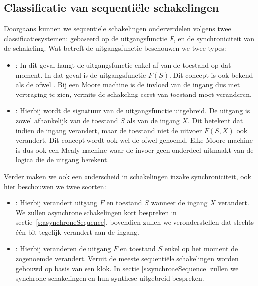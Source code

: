 \subsection{Classificatie van sequenti\"ele schakelingen}
\label{ss:classificationSequential}
Doorgaans kunnen we sequenti\"ele schakelingen onderverdelen volgens twee classificatiesystemen: gebaseerd op de uitgangsfunctie $F$, en de synchroniciteit van de schakeling. Wat betreft de uitgangsfunctie beschouwen we twee types:
\begin{itemize}
 \item {}: In dit geval hangt de uitgangsfunctie enkel af van de toestand op dat moment. In dat geval is de uitgangsfunctie $F\left(S\right)$. Dit concept is ook bekend als de  ofwel . Bij een Moore machine is de invloed van de ingang dus met vertraging te zien, vermits de schakeling eerst van toestand moet veranderen.
 \item {}: Hierbij wordt de signatuur van de uitgangsfunctie uitgebreid. De uitgang is zowel afhankelijk van de toestand $S$ als van de ingang $X$. Dit betekent dat indien de ingang verandert, maar de toestand niet de uitvoer $F\left(S,X\right)$ ook verandert. Dit concept wordt ook wel de  ofwel  genoemd. Elke Moore machine is dus ook een Mealy machine waar de invoer geen onderdeel uitmaakt van de logica die de uitgang berekent.
\end{itemize}
Verder maken we ook een onderscheid in schakelingen inzake synchroniciteit, ook hier beschouwen we twee soorten:
\begin{itemize}
 \item {}: Hierbij verandert uitgang $F$ en toestand $S$ wanneer de ingang $X$ verandert. We zullen asynchrone schakelingen kort bespreken in sectie~\ref{s:asynchroneSequence}, bovendien zullen we veronderstellen dat slechts \'e\'en bit tegelijk verandert aan de ingang.
 \item {}: Hierbij veranderen de uitgang $F$ en toestand $S$ enkel op het moment de zogenoemde  verandert.
Veruit de meeste sequenti\"ele schakelingen worden gebouwd op basis van een klok. In sectie \ref{s:synchroneSequence} zullen we synchrone schakelingen en hun synthese uitgebreid bespreken.
\end{itemize}
